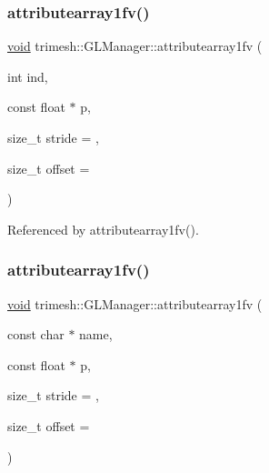 \subsubsection{\texorpdfstring{attributearray1fv()}{attributearray1fv()}\hspace{0.1cm}{\footnotesize\ttfamily [1/6]}}
{\footnotesize\ttfamily \hyperlink{namespacetrimesh_a784ddfd979e1c579bda795a8edfc3f43}{void} trimesh\+::\+G\+L\+Manager\+::attributearray1fv (\begin{DoxyParamCaption}\item[{int}]{ind,  }\item[{const float $\ast$}]{p,  }\item[{size\+\_\+t}]{stride = {},  }\item[{size\+\_\+t}]{offset = {} }\end{DoxyParamCaption})\hspace{0.3cm}{\ttfamily [inline]}}



Referenced by attributearray1fv().

\mbox{\label{classtrimesh_1_1GLManager_ae49a795bd7b858d3244973f361789757}} 
\subsubsection{\texorpdfstring{attributearray1fv()}{attributearray1fv()}\hspace{0.1cm}{\footnotesize\ttfamily [2/6]}}
{\footnotesize\ttfamily \hyperlink{namespacetrimesh_a784ddfd979e1c579bda795a8edfc3f43}{void} trimesh\+::\+G\+L\+Manager\+::attributearray1fv (\begin{DoxyParamCaption}\item[{const char $\ast$}]{name,  }\item[{const float $\ast$}]{p,  }\item[{size\+\_\+t}]{stride = {},  }\item[{size\+\_\+t}]{offset = {} }\end{DoxyParamCaption})\hspace{0.3cm}{\ttfamily [inline]}}

\mbox{\label{classtrimesh_1_1GLManager_a70295ba41bf0784fee5ef782a002f15b}} 
